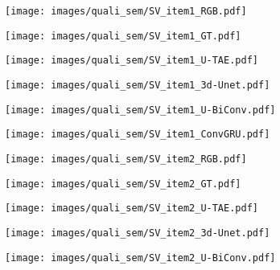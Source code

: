 \begin{figure*}

\begin{subfigure}{0.16\textwidth}
        \centering
        \texttt{[image: images/quali\_sem/SV\_item1\_RGB.pdf]}
        \end{subfigure}
    \hfill
        \begin{subfigure}{0.16\textwidth}
        \texttt{[image: images/quali\_sem/SV\_item1\_GT.pdf]}
        \end{subfigure}
    \hfill
        \begin{subfigure}{0.16\textwidth}
        \texttt{[image: images/quali\_sem/SV\_item1\_U-TAE.pdf]}
        \end{subfigure}
    \hfill
        \begin{subfigure}{0.16\textwidth}
        \texttt{[image: images/quali\_sem/SV\_item1\_3d-Unet.pdf]}
        \end{subfigure}
    \hfill
        \begin{subfigure}{0.16\textwidth}
        \texttt{[image: images/quali\_sem/SV\_item1\_U-BiConv.pdf]}
        \end{subfigure}
\hfill
        \begin{subfigure}{0.16\textwidth}
        \texttt{[image: images/quali\_sem/SV\_item1\_ConvGRU.pdf]}
        \end{subfigure}
\vfill
\begin{subfigure}{0.16\textwidth}
        \centering
        \texttt{[image: images/quali\_sem/SV\_item2\_RGB.pdf]}
        \end{subfigure}
    \hfill
        \begin{subfigure}{0.16\textwidth}
        \texttt{[image: images/quali\_sem/SV\_item2\_GT.pdf]}
        \end{subfigure}
    \hfill
        \begin{subfigure}{0.16\textwidth}
        \texttt{[image: images/quali\_sem/SV\_item2\_U-TAE.pdf]}
        \end{subfigure}
    \hfill
        \begin{subfigure}{0.16\textwidth}
        \texttt{[image: images/quali\_sem/SV\_item2\_3d-Unet.pdf]}
        \end{subfigure}
    \hfill
        \begin{subfigure}{0.16\textwidth}
        \texttt{[image: images/quali\_sem/SV\_item2\_U-BiConv.pdf]}

\end{subfigure}
\end{figure*}
